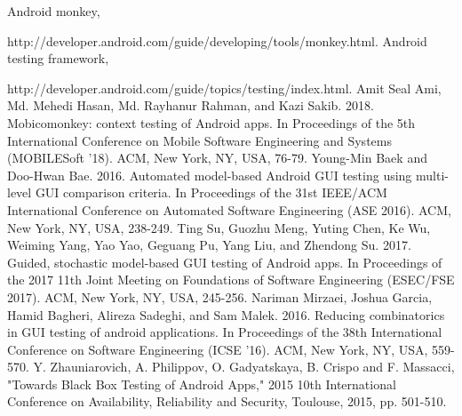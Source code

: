 \documentclass[conference]{IEEEtran}
\begin{document}
\begin{thebibliography}{00}
 Android monkey,

http://developer.android.com/guide/developing/tools/monkey.html.
Android testing framework,

http://developer.android.com/guide/topics/testing/index.html.
 Amit Seal Ami, Md. Mehedi Hasan, Md. Rayhanur Rahman, and Kazi Sakib. 2018. Mobicomonkey: context testing of Android apps. In Proceedings of the 5th International Conference on Mobile Software Engineering and Systems (MOBILESoft '18). ACM, New York, NY, USA, 76-79.
 Young-Min Baek and Doo-Hwan Bae. 2016. Automated model-based Android GUI testing using multi-level GUI comparison criteria. In Proceedings of the 31st IEEE/ACM International Conference on Automated Software Engineering (ASE 2016). ACM, New York, NY, USA, 238-249.
 Ting Su, Guozhu Meng, Yuting Chen, Ke Wu, Weiming Yang, Yao Yao, Geguang Pu, Yang Liu, and Zhendong Su. 2017. Guided, stochastic model-based GUI testing of Android apps. In Proceedings of the 2017 11th Joint Meeting on Foundations of Software Engineering (ESEC/FSE 2017). ACM, New York, NY, USA, 245-256.
 Nariman Mirzaei, Joshua Garcia, Hamid Bagheri, Alireza Sadeghi, and Sam Malek. 2016. Reducing combinatorics in GUI testing of android applications. In Proceedings of the 38th International Conference on Software Engineering (ICSE '16). ACM, New York, NY, USA, 559-570.
 Y. Zhauniarovich, A. Philippov, O. Gadyatskaya, B. Crispo and F. Massacci, "Towards Black Box Testing of Android Apps," 2015 10th International Conference on Availability, Reliability and Security, Toulouse, 2015, pp. 501-510.
\end{thebibliography}
\end{document}
